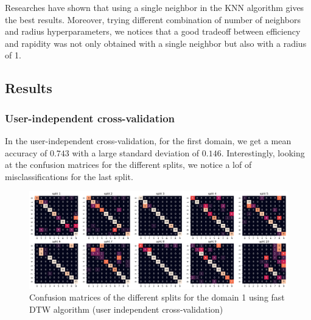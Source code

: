 Researches \cite[text]{keylist} have shown that using a single neighbor in the KNN algorithm gives the best results. Moreover, trying different combination of number of neighbors and radius hyperparameters, we notices that a good tradeoff between efficiency and rapidity was not only obtained with a single neighbor but also with a radius of 1.



\subsection{Results}

\subsubsection{User-independent cross-validation}

In the user-independent cross-validation, for the first domain, we get a mean accuracy of $0.743$ with a large standard deviation of $0.146$. Interestingly, looking at the confusion matrices for the different splits, we notice a lof of misclassifications for the last split.

\begin{figure}[H]
	\centering
	\includegraphics{figures/dtw/domain01/cm_dtw_d1_uindep.png}
	\caption{Confusion matrices of the different splits for the domain 1 using fast DTW algorithm (user independent cross-validation)}
	\label{fig:cm-dtw-d1-uindep}
\end{figure}

